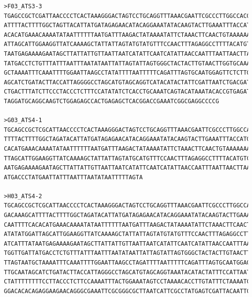 \begin{verbatim}
>F03_ATS3-3
TGAGCCGCTCGATTAACCCCTCACTAAAGGGACTAGTCCTGCAGGTTTAAACGAATTCGCCCTTGGCCACGCGTCGACTAGTACTTTTTTTTTTTTTTTTTTATTTTAAGGTGACAAAGC
ATTTTACTTTTGGCTAGTTACATTATGATAGAGAACATACAGGAAATATACAAGTACTTGAAATTTACCATGTTACATTATAAATTATGGACATAGACATTTAAGTTTTATGCAATTTTC
ACACATGAAACAAAATATAATTTTTTAATGATTTAAGACTATAAAATATTCTAAACTTCAACTGTAAAAAAAGTAGATTTGACACATGAGGTATGATTTAGTGACCAGTCCTATGTATGG
ATTAGCATTGGAAGGTTATCAAAAGCTATTATTAGTATGTATGTTTCCAACTTTAGAGGCCTTTTACATGTCCTTAATGAATTTATATGCCCTGCATTTGGCATTCAATGGTATCATTTA
TAATGAGAAAAGAATAGCTTATTATTGTTAATTAATCATATTCAATCATATTAACCAATTTAATTAACTTAATATTAATAAACGCACATTAATCAAATTAGTCAACTTAATATGGTTGAT
TATGACCTCTGTTTATTTAATTTAATATAATTATTAGTATTAGTGGGCTACTACTTGTAACTTGGTGCAAAAAAGCTGGTCAGTTTCAAACATTTTCTCTGCTGTCTCCCCTTTAGTAAT
GCTAAAATTTCAAATTTTGGAATTAAGCCTATATTTTAATTTTTCAGATTTAGTGCAATGGAGTTCTCTTGACCAGGTCATATACTCATGCAAATGATAGAAATTATAGCAAGTTGCAAT
AGCATCTGATACTTACCATTAGGGGCCTAGCATGTAGCAGGTCATACATACTATTCGATTAATCTGACGATTTCATATATGGATACGAATTGCCATTATTGGCTCATCATTGCACCCCTC
CTGACTTTATCTTCCCTACCCTCTTTCCATATATCTCACCTGCAAATCAGTACATAAATACACCGTGAGATAAGTCTAAACCTCCATTGTGGAAATTCCTGAATCATACTGGACCATTCC
TAGGATGCAGGCAAGTCTGGAGAGCCACTGAGAGCTCACGGACCGAAATCGGCGAGGCCCCG

>G03_ATS4-1
TGCAGCCGCTCGCATTAACCCCTCACTAAAGGGACTAGTCCTGCAGGTTTAAACGAATTCGCCCTTGGCCACGCGTCGACTAGTACTTTTTTTTTTTTTTTTTTTTAAGGTGACAAAGCA
TTTTACTTTTGGCTAGATACATTATGATAGAGAACATACAGGAAATATACAAGTACTTGAAATTTACCATGTTACATTAGAAATTATGGACATAGACATTTAAGTTTTATGCAATTTTCA
CACATGAAACAAAATATAATTTTTTAATGATTTAAGACTATAAAATATTCTAAACTTCAACTGTAAAAAAAGTAGATTTGACACATGAGGTATGATTTAGTGACCAGTCCTATGTATGGA
TTAGCATTGGAAGGTTATCAAAAGCTATTATTAGTATGCATGTTTCCAACTTTAGAGGCCTTTTACATGTCCTTAATGAATTTATATGCCCTGCATTTGGCATTCAATGGTATCATTTAT
AATGAGAAAAGAATAGCTTATTATTGTTAATTAATCATATTCAATCATATTAACCAATTTAATTAACTTAATATTAATAAACGCACATTAATCAAATTAGTCAACTTAAAATGGTTGATT
ATGACCCTATGAATTATTTAATTTAATATAATTTTTAGTA

>H03_ATS4-2
TGCAGCCGCTCGCATTAACCCCTCACTAAAGGGACTAGTCCTGCAGGTTTAAACGAATTCGCCCTTGGCCACGCGTCGACTAGTACTTTTTTTTTTTTTTTTTTTTTTTCATTTTAAGGT
GACAAAGCATTTTACTTTTGGCTAGATACATTATGATAGAGAACATACAGGAAATATACAAGTACTTGAAATTTACCATGTTACATTAGAAATTATGGACATAGACATTTAAGTTTTATG
CAATTTTCACACATGAAACAAAATATAATTTTTTAATGATTTAAGACTATAAAATATTCTAAACTTCAACTGTAAAAAAAGTAGATTTGACACATGAGGTATGATTTAGTGACCAGTCCT
ATATATGGATTAGCATTGGAAGGTTATCAAAAGCTATTATTAGTATGTATGTTTCCAACTTTAGAGGCCTTTTACATGTCCTTAATGAATTTATATGCCCTGCATTTGGCATTCAATGGT
ATCATTTATAATGAGAAAAGAATAGCTTATTATTGTTAATTAATCATATTCAATCATATTAACCAATTTAATTAACTTAATATTAATAAACGCACATTAATCAAATTAGTCAACTTAATA
TGGTTGATTATGACCTCTGTTTATTTAATTTAATATAATTATTAGTATTAGTGGGCTACTACTTGTAACTTGGTGCAAAAAAGCTGGTCAGTTTCAAACATTTTCTCTGCTGTCTCCCCT
TTAGTAATGCTAAAATTTCAAATTTTGGAATTAAGCCTAGATTTTAATTTTTCAGATTTAGTGCAATGGAGTTCTCTTGACCAAGTCATATACTCATGCAAATGATAGAAATTATAGCAA
TTGCAATAGCATCTGATACTTACCATTAGGGCCTAGCATGTAGCAGGTAAATACATACTATTTCCATTAATTGAGGGATTTCATATATGATACAATGCATTTTTGCTCATCTTCACCCTC
CTATTTTTTTTCCTTACCCTCTTCCAAAATTTACTGGAAATAGTCCTAAAACACCTTGTATTTCTAAAATCATTTGGATTTCTGGAAATATACCTGGCATCCTAAGGATGAAGGAAAGCT
GGACACACAGAGGAAGAACAGGGCGAAATTCGCGGGCGCTTAATCATTCGCCTATGAGTCGATTACAATTCACTGGCCGGTCCGATTTCA


\end{verbatim}
